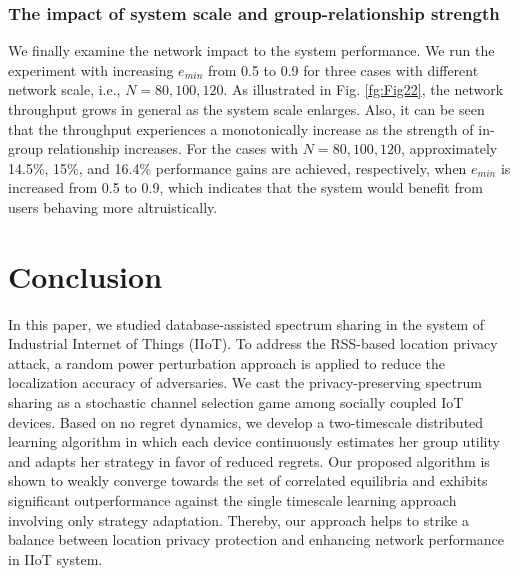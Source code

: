 \subsubsection{The impact of system scale and group-relationship strength} We finally examine the network impact to the system performance. We run the experiment with increasing $e_{min}$ from 0.5 to 0.9 for three cases with different network scale, i.e., $N=80, 100, 120$. As illustrated in Fig. \ref{fg:Fig22}, the network throughput grows in general as the system scale enlarges. Also, it can be seen that the throughput experiences a monotonically increase as the strength of in-group relationship increases. For the cases with $N=80, 100, 120$, approximately 14.5\%, 15\%, and 16.4\% performance gains are achieved, respectively, when $e_{min}$ is increased from 0.5 to 0.9, which indicates that the system would benefit from users behaving more altruistically. 

\section{Conclusion}\label{sec:con}
In this paper, we studied database-assisted spectrum sharing in the system of Industrial Internet of Things (IIoT). To address the RSS-based location privacy attack, a random power perturbation approach is applied to reduce the localization accuracy of adversaries. We cast the privacy-preserving spectrum sharing as a stochastic channel selection game among socially coupled IoT devices. Based on no regret dynamics, we develop a two-timescale distributed learning algorithm in which each device continuously estimates her group utility and adapts her strategy in favor of reduced regrets. Our proposed algorithm is shown to weakly converge towards the set of correlated equilibria and exhibits significant outperformance against the single timescale learning approach involving only strategy adaptation. Thereby, our approach helps to strike a balance between location privacy protection and enhancing network performance in IIoT system.

